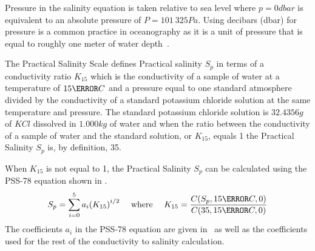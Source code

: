 Pressure in the salinity equation is taken relative to sea level where $p = 0 dbar$ is equivalent to an absolute pressure of $P = 101\ 325 Pa$.
Using decibars (dbar) for pressure is a common practice in oceanography as it is a unit of pressure that is equal to roughly one meter of water depth~\cite{seabird_dbar_to_depth_2024}.

The Practical Salinity Scale defines Practical salinity $S_p$ in terms of a conductivity ratio $K_{15}$ which is the conductivity of a sample of water at a temperature of $15\degree C$ and a pressure equal to one standard atmosphere divided by the conductivity of a standard potassium chloride solution at the same temperature and pressure.
The standard potassium chloride solution is $32.4356g$ of $KCl$ dissolved in $1.000kg$ of water and when the ratio between the conductivity of a sample of water and the standard solution, or $K_{15}$, equals 1 the Practical Salinity $S_p$ is, by definition, 35.

When $K_{15}$ is not equal to 1, the Practical Salinity $S_p$ can be calculated using the PSS-78 equation shown in .
\begin{equation}\label{eq:pss-78-k15}
    S_p = \sum_{i=0}^{5} a_i {(K_{15})}^{i/2}~~~~\text{where}~~~~K_{15} = \frac{C(S_p, 15\degree C, 0)}{C(35, 15\degree C, 0)}
\end{equation}
The coefficients $a_i$ in the PSS-78 equation are given in~ as well as the coefficients used for the rest of the conductivity to salinity calculation. 


